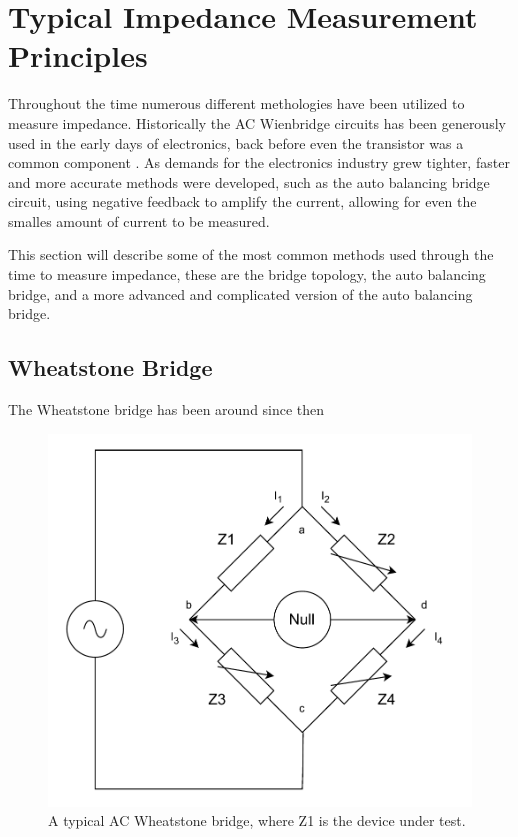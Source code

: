 \section{Typical Impedance Measurement Principles} \label{sec:TypicalMeasPrin}
Throughout the time numerous different methologies have been utilized to measure impedance. Historically the AC Wienbridge circuits has been generously used in the 
early days of electronics, back before even the transistor was a common component \cite{IET_LABS_LCR_PRINCIPLES}. As demands for the electronics industry grew tighter,
faster and more accurate methods were developed, such as the auto balancing bridge circuit, using negative feedback to amplify the current, allowing for even the
smalles amount of current to be measured.

This section will describe some of the most common methods used through the time to measure impedance, these are the bridge topology, the auto balancing bridge, and a more advanced
and complicated version of the auto balancing bridge. 

\subsection{Wheatstone Bridge}
The Wheatstone bridge has been around since then 
\begin{figure}[H]
    \centering
    \includegraphics[width=1\textwidth]{Sections/4_TechnicalAnalysis/Figures_JFT/WheatstoneBridgeAC.pdf}
    \caption{A typical AC Wheatstone bridge, where Z1 is the device under test.}
    \label{fig_4_2_WheatstoneBridge}
\end{figure}